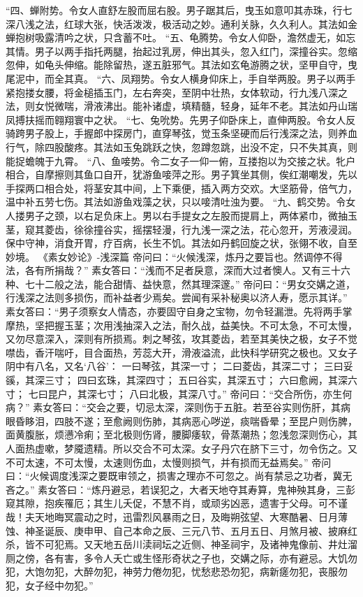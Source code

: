 \documentclass[12pt,UTF8]{ctexbook}
\begin{document}
“四、蝉附势。令女人直舒左股而屈右股。男子踞其后，曳玉如意叩其赤珠，行七深八浅之法，红球大张，快活泼泼，极活动之妙。通利关脉，久久利人。其法如金蝉抱树吸露清吟之状，只含蓄不吐。
“五、龟腾势。令女人仰卧，澹然虚无，如忘其情。男子以两手指托两腿，抬起过乳房，伸出其头，忽入红门，深撞谷实。忽缩忽伸，如龟头伸缩。能除留热，遂五脏邪气。其法如玄龟游腾之状，坚甲自守，曳尾泥中，而全其真。
“六、凤翔势。令女人横身仰床上，手自举两股。男子以两手紧抱搂女腰，将金槌插玉门，左右奔突，至阴中壮热，女体软动，行九浅八深之法，则女悦微喘，滑液沸出。能补诸虚，填精髓，轻身，延年不老。其法如丹山瑞凤搏扶摇而翱翔寰中之状。
“七、兔吮势。先男子仰卧床上，直伸两股。令女人反骑跨男子股上，手握郎中探房门，直穿琴弦，觉玉条坚硬而后行浅深之法，则养血行气，除四股酸疼。其法如玉兔跳跃之快，忽蹲忽跳，出没不定，只不失其真，则能捉蟾魄于九霄。
“八、鱼唼势。令二女子一仰一俯，互搂抱以为交接之状。牝户相合，自摩擦则其鱼口自开，犹游鱼唼萍之形。男子箕坐其侧，俟红潮嘲发，先以手探两口相合处，将茎安其中间，上下乘便，插入两方交欢。大坚筋骨，倍气力，温中补五劳七伤。其法如游鱼戏藻之状，只以唼清吐浊为要。
“九、鹤交势。令女人搂男子之颈，以右足负床上。男以右手提女之左股而提肩上，两体紧巾，微抽玉茎，窥其菱齿，徐徐撞谷实，摇摆轻漫，行九浅一深之法，花心忽开，芳液浸润。保中守神，消食开胃，疗百病，长生不饥。其法如丹鹤回旋之状，张翎不收，自至妙境。
《素女妙论》-浅深篇
帝问曰：“火候浅深，炼丹之要旨也。然调停不得法，各有所捐哉？”
素女答曰：“浅而不足者戾意，深而大过者懊人。又有三十六种、七十二般之法，能合甜情、益快意，然其理深邃。”
帝问曰：“男女交媾之道，行浅深之法则多损伤，而补益者少焉矣。尝闻有采补秘奥以济人寿，愿示其详。”
素女答曰：“男子须察女人情态，亦要固守自身之宝物，勿令轻漏泄。先将两手掌摩热，坚把握玉茎；次用浅抽深入之法，耐久战，益美快。不可太急，不可太慢，又勿尽意深入，深则有所损焉。刺之琴弦，攻其菱齿，若至其美快之极，女子不觉噤齿，香汗喘吁，目合面热，芳蕊大开，滑液溢流，此快科学研究之极也。又女子阴中有八名，又名‘八谷’：
一曰琴弦，其深一寸；
二曰菱齿，其深二寸；
三曰妥豀，其深三寸；
四曰玄珠，其深四寸；
五曰谷实，其深五寸；
六曰愈阙，其深六寸；
七曰昆户，其深七寸；
八曰北极，其深八寸。”
帝问曰：“交合所伤，亦生何病？”
素女答曰：“交会之要，切忌太深，深则伤于五脏。若至谷实则伤肝，其病眼昏眵泪，四肢不遂；至愈阙则伤肺，其病恶心哕逆，痰喘昏晕；至昆户则伤脾，面黄腹胀，烦懑冷痢；至北极则伤肾，腰脚痿软，骨蒸潮热；忽浅忽深则伤心，其人面热虚嗽，梦魇遗精。所以交合不可太深。女子丹穴在脐下三寸，勿令伤之。又不可太速，不可太慢，太速则伤血，太慢则损气，并有损而无益焉矣。”
帝问曰：“火候调度浅深之要既审领之，损害之理亦不可忽之。尚有禁忌之功者，冀无吝之。”
素女答曰：“炼丹避忌，若误犯之，大者天地夺其寿算，鬼神殃其身，三彭窥其隙，抱疾罹厄；其生儿夭促，不慧不肖，或顽劣凶恶，遗害于父母。可不谨哉！夫天地晦冥震动之时，迅雷烈风暴雨之日，及晦朔弦望、大寒酷暑、日月薄蚀、神圣诞辰、庚申甲、自己本命之辰、三元八节、五月五日、月煞月被、披麻红杀，皆不可犯焉。又天地五岳川渎祠坛之近侧、神圣祠宇，及诸神鬼像前、井灶溜厕之傍，各有害，多令人夭亡或生怪形奇状之子也，交媾之际，亦有避忌。大饥勿犯，大饱勿犯，大醉勿犯，神劳力倦勿犯，忧愁悲恐勿犯，病新瘥勿犯，丧服勿犯，女子经中勿犯。”
\end{document}
